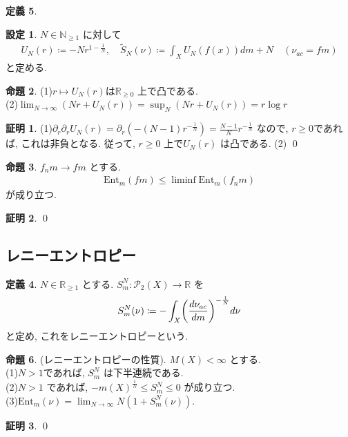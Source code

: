 \documentclass[10pt, fleqn, label-section=none]{bxjsarticle}
\theoremstyle{definition}
\newtheorem{dfn}{定義}[section]
\newtheorem{prop}[dfn]{命題}
\newtheorem{setting}[dfn]{設定}
\newtheorem*{pf*}{証明}
\newcommand{\paren}[1]{\mleft( #1\mright )}
\newcommand{\Ent}{\textrm{Ent}}
\renewcommand{\;}{\, ; \,}
\begin{document}
\begin{dfn}
\begin{setting}$N \in \mathbb N_{\geq1}$ に対して
\begin{align*} U_N (r) \coloneqq - N r^{1- \frac{1}{N}}, \quad \tilde S_N (\nu) \coloneqq \int_X U_N(f(x)) dm + N \quad (\nu_{ac} = fm )\end{align*}
と定める. 
\end{setting}

\begin{prop}
(1)$r \mapsto U_N(r)$は$\mathbb R_{\geq 0}$ 上で凸である. \\
(2)$\lim_{N \rightarrow \infty} (N r + U_N (r)) = \sup_N  (N r + U_N (r)) = r \log r$
\end{prop}
\begin{pf*}
(1)$\partial_r \partial_r U_N(r) = \partial _r (- (N-1) r^{-\frac{1}{N} } ) = \frac{N-1}{N} r ^{- \frac{1}{N}}$ なので, $r \geq 0 $であれば, これは非負となる. 従って, $r \geq 0$ 上で$U_N(r)$ は凸である. (2)
\qed
\end{pf*}

\begin{prop}$f_n m \rightarrow f m $ とする. 
\begin{align*} \Ent_m( f m) \leq \liminf \Ent_m (f_n m )\end{align*}
が成り立つ. 
\end{prop}
\begin{pf*}

\qed
\end{pf*}


\subsection{レニーエントロピー}

\begin{dfn}$N \in \mathbb R_{\geq 1}$ とする. 
$S^N_m: \mathcal P_2(X) \rightarrow \mathbb R$ を
\begin{align*} S^N_m(\nu) \coloneqq - \int_X \paren{\frac{d\nu_{ac} }{dm} }^{-\frac{1}{N}} d \nu \end{align*}
と定め, これをレニーエントロピーという. 
\end{dfn}




\end{dfn}

\begin{prop}(レニーエントロピーの性質). $M(X) < \infty$ とする. \\
(1)$N > 1$であれば, $S^N_m$ は下半連続である. \\
(2)$N >1$ であれば, $-m(X)^{\frac{1}{N}} \leq S^N_m \leq 0$ が成り立つ. \\
(3)$\Ent_m(\nu) = \lim_{N \rightarrow \infty} N(1 + S^N_m (\nu)).$ 

\end{prop}
\begin{pf*}

\qed
\end{pf*}
\end{document}
